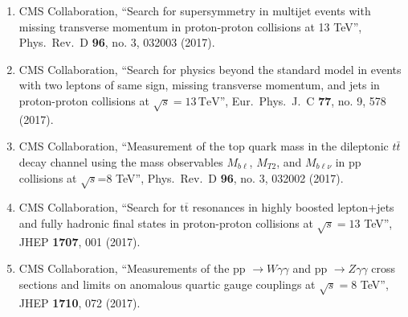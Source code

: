 \begin{enumerate}
\item CMS Collaboration, ``Search for supersymmetry in multijet events with missing transverse momentum in proton-proton collisions at 13 TeV'', Phys.\ Rev.\ D {\bf 96}, no. 3, 032003 (2017).

\item CMS Collaboration, ``Search for physics beyond the standard model in events with two leptons of same sign, missing transverse momentum, and jets in proton-proton collisions at $\sqrt{s} = 13\,\text {TeV} $'', Eur.\ Phys.\ J.\ C {\bf 77}, no. 9, 578 (2017).

\item CMS Collaboration, ``Measurement of the top quark mass in the dileptonic $t\bar{t}$ decay channel using the mass observables $M_{b\ell}$, $M_{T2}$, and $M_{b\ell\nu}$ in pp collisions at $\sqrt{s}$=8 TeV'', Phys.\ Rev.\ D {\bf 96}, no. 3, 032002 (2017).

\item CMS Collaboration, ``Search for $ \mathrm{t}\overline{\mathrm{t}} $ resonances in highly boosted lepton+jets and fully hadronic final states in proton-proton collisions at $ \sqrt{s}=13 $ TeV'', JHEP {\bf 1707}, 001 (2017).

\item CMS Collaboration, ``Measurements of the pp $\to W\gamma\gamma$ and pp $\to Z\gamma\gamma$ cross sections and limits on anomalous quartic gauge couplings at $ \sqrt{s}=8 $ TeV'', JHEP {\bf 1710}, 072 (2017).


\end{enumerate}
